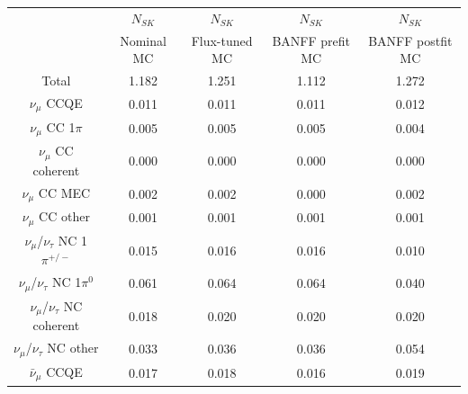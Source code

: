 \begin{table}
\begin{tabular} { | c ||c | c | c | c |  | }
\hline
                                                  & $N_{SK}$            & $N_{SK}$            & $N_{SK}$            & $N_{SK}$             \\ 
                                                  & Nominal MC          & Flux-tuned MC       & BANFF prefit MC     & BANFF postfit MC     \\ \hline 
Total                                             & 1.182               & 1.251               & 1.112               & 1.272                \\ \hline 
\hline 
$\nu_\mu$ CCQE                                    & 0.011               & 0.011               & 0.011               & 0.012                \\ \hline 
$\nu_\mu$ CC 1$\pi$                               & 0.005               & 0.005               & 0.005               & 0.004                \\ \hline 
$\nu_\mu$ CC coherent                             & 0.000               & 0.000               & 0.000               & 0.000                \\ \hline 
$\nu_\mu$ CC MEC                                  & 0.002               & 0.002               & 0.000               & 0.002                \\ \hline 
$\nu_\mu$ CC other                                & 0.001               & 0.001               & 0.001               & 0.001                \\ \hline 
$\nu_\mu$/$\nu_\tau$ NC 1$\pi^{+/-}$              & 0.015               & 0.016               & 0.016               & 0.010                \\ \hline 
$\nu_\mu$/$\nu_\tau$ NC 1$\pi^0$                  & 0.061               & 0.064               & 0.064               & 0.040                \\ \hline 
$\nu_\mu$/$\nu_\tau$ NC coherent                  & 0.018               & 0.020               & 0.020               & 0.020                \\ \hline 
$\nu_\mu$/$\nu_\tau$ NC other                     & 0.033               & 0.036               & 0.036               & 0.054                \\ \hline 
$\bar{\nu}_\mu$ CCQE                              & 0.017               & 0.018               & 0.016               & 0.019                \\ \hline 

\end{tabular}
\end{table}
